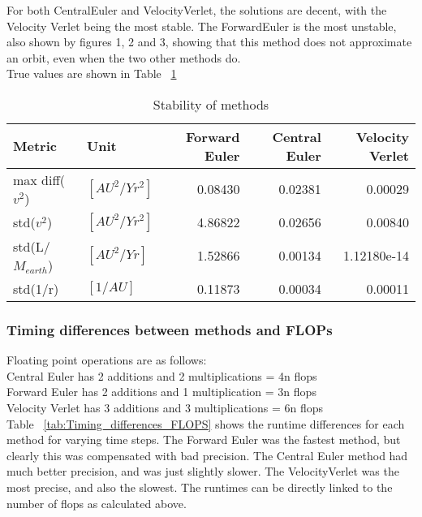 For both CentralEuler and VelocityVerlet, the solutions are decent, with the Velocity Verlet being the most stable. The ForwardEuler is the most unstable, also shown by figures 1, 2 and 3, showing that this method does not approximate an orbit, even when the two other methods do. \\

True values are shown in Table ~\ref{tab:Stability_methods_tabular}\\

\FloatBarrier
\begin{table}
\begin{tabular}{llrrr}
\toprule 
Metric & Unit & Forward Euler & Central Euler & Velocity Verlet \\ 
\midrule 
max diff($v^2$) & $[AU^2/Yr^2]$  & 0.08430  & 0.02381 & 0.00029 \\ 
std($v^2$) &$[AU^2/Yr^2]$ & 4.86822 & 0.02656 & 0.00840 \\  
std(L/$M_{earth}$) &$[AU^2/Yr]$ & 1.52866 &  0.00134 & 1.12180e-14 \\ 
std(1/r) & $[1/AU]$ & 0.11873 & 0.00034 & 0.00011 \\ 
\bottomrule
\end{tabular}
\caption{Stability of methods}
\label{tab:Stability_methods_tabular}
\end{table}
\FloatBarrier

\subsubsection{Timing differences between methods and FLOPs}
Floating point operations are as follows:\\
Central Euler has 2 additions and 2 multiplications = 4n flops\\
Forward Euler has 2 additions and 1 multiplication = 3n flops\\
Velocity Verlet has 3 additions and 3 multiplications = 6n flops\\


Table ~\ref{tab:Timing_differences_FLOPS} shows the runtime differences for each method for varying time steps. The Forward Euler was the fastest method, but clearly this was compensated with bad precision. The Central Euler method had much better precision, and was just slightly slower. The VelocityVerlet was the most precise, and also the slowest. The runtimes can be directly linked to the number of flops as calculated above. 

